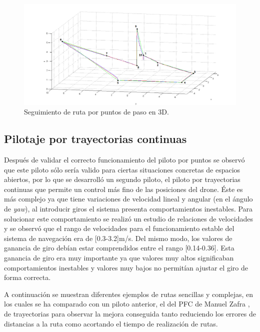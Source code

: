 \begin{figure}[H]
	\begin{center}
		\includegraphics[width=1.0\textwidth]{imag/IMG47.png}
				\caption{Seguimiento de ruta por puntos de paso en 3D.}
		\label{fig:Error asociado al pilotaje.}	
	\end{center}
\end{figure}

\subsection{Pilotaje por trayectorias continuas}
\hspace{1cm} Después de validar el correcto funcionamiento del piloto por puntos se observó que este piloto sólo sería valido para ciertas situaciones concretas de espacios abiertos, por lo que se desarrolló un segundo piloto, el piloto por trayectorias continuas que permite un control más fino de las posiciones del drone. Éste es más complejo ya que tiene variaciones de velocidad lineal y angular (en el ángulo de \textit{yaw}), al introducir giros el sistema presenta comportamientos inestables. Para solucionar este comportamiento se realizó un estudio de relaciones de velocidades y se observó que el rango de velocidades para el funcionamiento estable del sistema de navegación era de [0.3-3.2]m/s. Del mismo modo, los valores de ganancia de giro debían estar comprendidos entre el rango [0.14-0.36]. Esta ganancia de giro era muy importante ya que valores muy altos significaban comportamientos inestables y valores muy bajos no permitían ajustar el giro de forma correcta. 

\hspace{1cm} A continuación se muestran diferentes ejemplos de rutas sencillas y complejas, en los cuales se ha comparado con un piloto anterior, el del PFC de Manuel Zafra \cite{ManuelZafra}, de trayectorias para observar la mejora conseguida tanto reduciendo los errores de distancias a la ruta como acortando el tiempo de realización de rutas.
\\
\\

